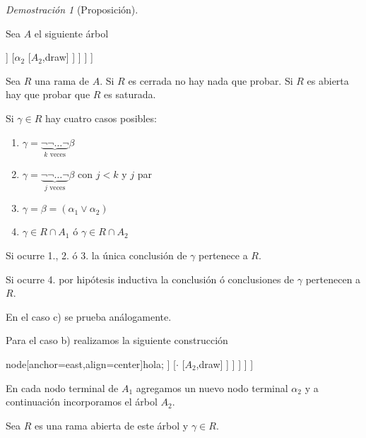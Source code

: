 \documentclass[a4paper,11pt]{article}
\theoremstyle{definition}
\theoremstyle{remark}
\newtheorem*{demo}{Demostración}
\begin{document}
\begin{demo}[Proposición]
\begin{itemize}
  Sea $A$ el siguiente árbol
  
  \begin{center}
   \begin{forest}
    [$\alpha$
      [$\dots$
	[$\beta$
	  [$\alpha_1$
	    [$A_1$,draw]
	  ]
	  [$\alpha_2$
	    [$A_2$,draw]
	  ]
	]
      ]
    ]
   \end{forest}
  \end{center}

  Sea $R$ una rama de $A$. Si $R$ es cerrada no hay nada que probar. Si $R$ es abierta
  hay que probar que $R$ es saturada.
  
  Si $\gamma \in R$ hay cuatro casos posibles:
  
  \begin{enumerate}
   \item $\gamma = \underbrace{\lnot\lnot\dots\lnot}_{k\text{ veces}}\beta$
   
   \item $\gamma = \underbrace{\lnot\lnot\dots\lnot}_{j\text{ veces}}\beta$ con $j < k$ y $j$ par
   
   \item $\gamma = \beta = (\alpha_1 \lor \alpha_2)$
   
   \item $\gamma \in R \cap A_1$ ó $\gamma \in R \cap A_2$
  \end{enumerate}

  Si ocurre 1., 2. ó 3. la única conclusión de $\gamma$ pertenece a $R$.
  
  Si ocurre 4. por hipótesis inductiva la conclusión ó conclusiones de $\gamma$
  pertenecen a $R$.
  
  En el caso c) se prueba análogamente.
  
  Para el caso b) realizamos la siguiente construcción

  \begin{center}
   \begin{forest}
    [$\alpha$
      [$\dots$
	[$\beta$
	  [$\alpha_1$,tikz={\node [draw,fit=()(!2)(!1)] {};}
	    [$\cdot$
	      [$A_2$,draw] {node[anchor=east,align=center]{hola};}
	    ]
	    [$\cdot$
	      [$A_2$,draw]
	    ]
	  ]
	]
      ]
    ]
   \end{forest}
  \end{center}

  En cada nodo terminal de $A_1$ agregamos un nuevo nodo terminal $\alpha_2$ y a
  continuación incorporamos el árbol $A_2$.
  
  Sea $R$ es una rama abierta de este árbol y $\gamma \in R$.
  

\end{itemize}
\end{demo}
\end{document}
